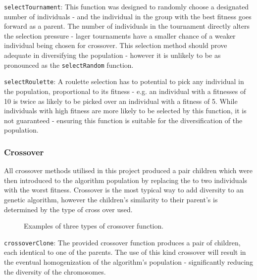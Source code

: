 			\texttt{selectTournament}: This function was designed to randomly choose a designated number of individuals - and the individual in the group with the best fitness goes forward as a parent. The number of individuals in the tournament directly alters the selection pressure - lager tournaments have a smaller chance of a weaker individual being chosen for crossover. This selection method should prove adequate in diversifying the population - however it is unlikely to be as pronounced as the \texttt{selectRandom} function.
			
			\texttt{selectRoulette}: A roulette selection has to potential to pick any individual in the population, proportional to its fitness - e.g. an individual with a fitnesses of 10 is twice as likely to be picked over an individual with a fitness of 5. While individuals with high fitness are more likely to be selected by this function, it is not guaranteed - ensuring this function is suitable for the diversification of the population.
		
		\subsubsection{Crossover}
			All  crossover methods utilised in this project produced a pair children which were then introduced to the algorithm population by replacing the to two individuals with the worst fitness. Crossover is the most typical way to add diversity to an genetic algorithm, however the children's similarity to their parent's is determined by the type of cross over used.
			
			\begin{figure*}[]
				\centering
				\hfil
				\newline
				\caption{Examples of three types of crossover function.}
				\label{fig_cross}
			\end{figure*}
	
			\texttt{crossoverClone}: The provided crossover function produces a pair of children, each identical to one of the parents. The use of this kind crossover will result in the eventual homogenization of the algorithm's population - significantly reducing the diversity of the chromosomes. 
		
